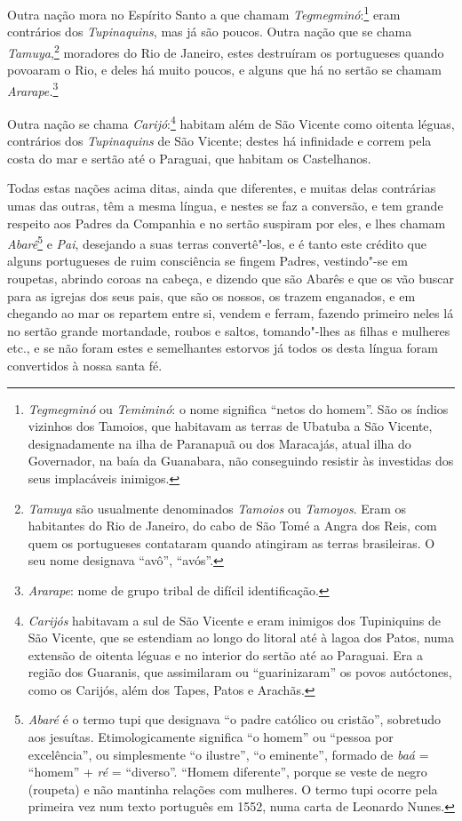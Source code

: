  Outra nação mora no Espírito Santo a que chamam 
\textit{Tegmegminó}:\footnote{ \textit{Tegmegminó} ou \textit{Temiminó}: o nome significa
``netos do homem''. São os índios vizinhos dos Tamoios, que habitavam as
terras de Ubatuba a São Vicente, designadamente na ilha de Paranapuã ou
dos Maracajás, atual ilha do Governador, na baía da Guanabara, não
conseguindo resistir às investidas dos seus implacáveis
inimigos.} eram contrários dos \textit{Tupinaquins}, mas já
são poucos. Outra nação que se chama \textit{Tamuya},\footnote{ \textit{Tamuya} são usualmente denominados \textit{Tamoios} ou
\textit{Tamoyos}. Eram os habitantes do Rio de Janeiro, do cabo de São
Tomé a Angra dos Reis, com quem os portugueses contataram quando
atingiram as terras brasileiras. O seu nome designava ``avô'', ``avós''.}
moradores do Rio de Janeiro, estes destruíram os portugueses
quando povoaram o Rio, e deles há muito poucos, e alguns que há no
sertão se chamam \textit{Ararape.}\footnote{ \textit{Ararape}: nome
de grupo tribal de difícil identificação.} 

 Outra nação se chama \textit{Carijó}:\footnote{ \textit{Carijós} 
habitavam a sul de São Vicente e eram inimigos dos Tupiniquins de São
Vicente, que se estendiam ao longo do litoral até à lagoa dos Patos,
numa extensão de oitenta léguas e no interior do sertão até ao
Paraguai. Era a região dos Guaranis, que assimilaram ou ``guarinizaram''
os povos autóctones, como os Carijós, além dos Tapes, Patos e Arachãs.} 
habitam além de São Vicente como oitenta léguas, contrários dos
\textit{Tupinaquins} de São Vicente; destes há infinidade e correm pela
costa do mar e sertão até o Paraguai, que habitam os Castelhanos. 

 Todas estas nações acima ditas, ainda que diferentes, e muitas delas
contrárias umas das outras, têm a mesma língua, e nestes se faz a
conversão, e tem grande respeito aos Padres da Companhia e no sertão
suspiram por eles, e lhes chamam \textit{Abarê}\footnote{ \textit{Abaré} 
é o termo tupi que designava ``o padre católico ou
cristão'', sobretudo aos jesuítas. Etimologicamente significa ``o homem''
ou ``pessoa por excelência'', ou simplesmente ``o ilustre'', ``o eminente'',
formado de \textit{baá} = ``homem'' + \textit{ré} = ``diverso''. ``Homem
diferente'', porque se veste de negro (roupeta) e não mantinha relações
com mulheres. O termo tupi ocorre pela primeira vez num texto português
em 1552, numa carta de Leonardo Nunes.} e\textit{
Pai}, desejando a suas terras convertê"-los, e é tanto este crédito que
alguns portugueses de ruim consciência se fingem Padres, vestindo"-se em
roupetas, abrindo coroas na cabeça, e dizendo que são Abarês e que os
vão buscar para as igrejas dos seus pais, que são os nossos, os trazem
enganados, e em chegando ao mar os repartem entre si, vendem e ferram,
fazendo primeiro neles lá no sertão grande mortandade, roubos e saltos,
tomando"-lhes as filhas e mulheres etc., e se não foram estes e
semelhantes estorvos já todos os desta língua foram convertidos à nossa santa fé.


